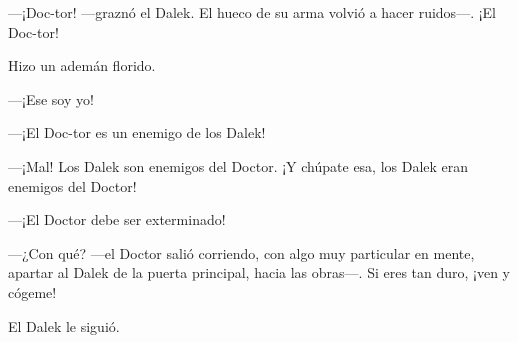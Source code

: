 ---¡Doc-tor! ---graznó el Dalek. El hueco de su arma volvió a hacer
ruidos---. ¡El Doc-tor!

Hizo un ademán florido.

---¡Ese soy yo!

---¡El Doc-tor es un enemigo de los Dalek!

---¡Mal! Los Dalek son enemigos del Doctor. ¡Y chúpate esa, los Dalek
eran enemigos del Doctor!

---¡El Doctor debe ser exterminado!

---¿Con qué? ---el Doctor salió corriendo, con algo muy particular en
mente, apartar al Dalek de la puerta principal, hacia las obras---. Si
eres tan duro, ¡ven y cógeme!

El Dalek le siguió.